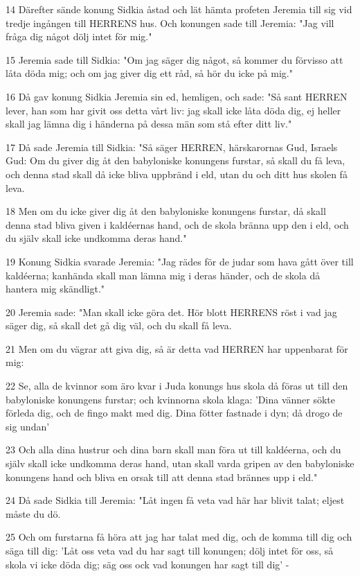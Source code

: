 \par 14 Därefter sände konung Sidkia åstad och lät hämta profeten Jeremia till sig vid tredje ingången till HERRENS hus. Och konungen sade till Jeremia: "Jag vill fråga dig något dölj intet för mig."
\par 15 Jeremia sade till Sidkia: "Om jag säger dig något, så kommer du förvisso att låta döda mig; och om jag giver dig ett råd, så hör du icke på mig."
\par 16 Då gav konung Sidkia Jeremia sin ed, hemligen, och sade: "Så sant HERREN lever, han som har givit oss detta vårt liv: jag skall icke låta döda dig, ej heller skall jag lämna dig i händerna på dessa män som stå efter ditt liv."
\par 17 Då sade Jeremia till Sidkia: "Så säger HERREN, härskarornas Gud, Israels Gud: Om du giver dig åt den babyloniske konungens furstar, så skall du få leva, och denna stad skall då icke bliva uppbränd i eld, utan du och ditt hus skolen få leva.
\par 18 Men om du icke giver dig åt den babyloniske konungens furstar, då skall denna stad bliva given i kaldéernas hand, och de skola bränna upp den i eld, och du själv skall icke undkomma deras hand."
\par 19 Konung Sidkia svarade Jeremia: "Jag rädes för de judar som hava gått över till kaldéerna; kanhända skall man lämna mig i deras händer, och de skola då hantera mig skändligt."
\par 20 Jeremia sade: "Man skall icke göra det. Hör blott HERRENS röst i vad jag säger dig, så skall det gå dig väl, och du skall få leva.
\par 21 Men om du vägrar att giva dig, så är detta vad HERREN har uppenbarat för mig:
\par 22 Se, alla de kvinnor som äro kvar i Juda konungs hus skola då föras ut till den babyloniske konungens furstar; och kvinnorna skola klaga: 'Dina vänner sökte förleda dig, och de fingo makt med dig. Dina fötter fastnade i dyn; då drogo de sig undan'
\par 23 Och alla dina hustrur och dina barn skall man föra ut till kaldéerna, och du själv skall icke undkomma deras hand, utan skall varda gripen av den babyloniske konungens hand och bliva en orsak till att denna stad brännes upp i eld."
\par 24 Då sade Sidkia till Jeremia: "Låt ingen få veta vad här har blivit talat; eljest måste du dö.
\par 25 Och om furstarna få höra att jag har talat med dig, och de komma till dig och säga till dig: 'Låt oss veta vad du har sagt till konungen; dölj intet för oss, så skola vi icke döda dig; säg oss ock vad konungen har sagt till dig' -
